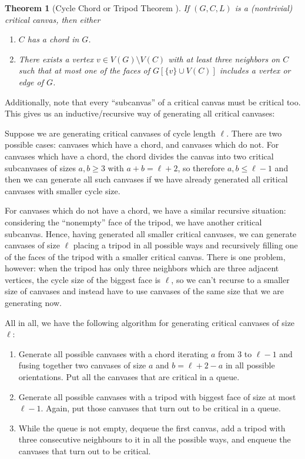\documentclass{article}
\newtheorem{theorem}{Theorem}
\begin{document}
\begin{theorem}[Cycle Chord or Tripod Theorem \cite{fivelistcoloring2}]
If $(G, C, L)$ is a (nontrivial) critical canvas, then either

\begin{enumerate}
	\item $C$ has a chord in $G$.
	\item There exists a vertex $v \in V(G) \setminus V(C)$ with at least three neighbors on $C$ such that at most one of the faces of $G[\{v\} \cup V(C)]$ includes a vertex or edge of $G$.
\end{enumerate}
\end{theorem}

Additionally, note that every ``subcanvas'' of a critical canvas must be critical too. This gives us an inductive/recursive way of generating all critical canvases:

Suppose we are generating critical canvases of cycle length $\ell$. There are two possible cases: canvases which have a chord, and canvases which do not. For canvases which have a chord, the chord divides the canvas into two critical subcanvases of sizes $a, b \geq 3$ with $a+b = \ell + 2$, so therefore $a, b \leq \ell-1$ and then we can generate all such canvases if we have already generated all critical canvases with smaller cycle size. 

For canvases which do not have a chord, we have a similar recursive situation: considering the ``nonempty'' face of the tripod, we have another critical subcanvas. Hence, having generated all smaller critical canvases, we can generate canvases of size $\ell$ placing a tripod in all possible ways and recursively filling one of the faces of the tripod with a smaller critical canvas. There is one problem, however: when the tripod has only three neighbors which are three adjacent vertices, the cycle size of the biggest face is $\ell$, so we can't recurse to a smaller size of canvases and instead have to use canvases of the same size that we are generating now.

All in all, we have the following algorithm for generating critical canvases of size $\ell$:

\begin{enumerate}
	\item Generate all possible canvases with a chord iterating $a$ from $3$ to $\ell-1$ and fusing together two canvases of size $a$ and $b = \ell+2-a$ in all possible orientations. Put all the canvases that are critical in a queue.
	\item Generate all possible canvases with a tripod with biggest face of size at most $\ell-1$. Again, put those canvases that turn out to be critical in a queue.
	\item While the queue is not empty, dequeue the first canvas, add a tripod with three consecutive neighbours to it in all the possible ways, and enqueue the canvases that turn out to be critical.
\end{enumerate}
\end{document}
